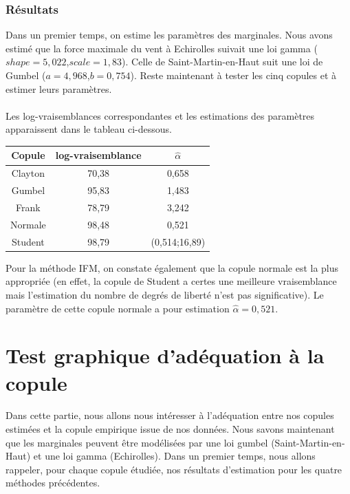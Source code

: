 \subsubsection{Résultats}

Dans un premier temps, on estime les paramètres des marginales. Nous avons estimé que la force maximale du vent à Echirolles suivait une loi gamma ($shape=5,022$,$scale=1,83$). Celle de Saint-Martin-en-Haut suit une loi de Gumbel ($a =4,968$,$b = 0,754$). Reste maintenant à tester les cinq copules et à estimer leurs paramètres.
\\ \\
 Les log-vraisemblances correspondantes et les estimations des paramètres apparaissent dans le tableau ci-dessous.

\begin{center}
\begin{tabular}{|c|c|c|}
\hline 
Copule & log-vraisemblance &  $\hat{\alpha}$ \\
\hline
Clayton & 70,38 & 0,658 \\
\hline
Gumbel & 95,83 & 1,483 \\
\hline
Frank & 78,79 & 3,242 \\
\hline
Normale &  98,48 & 0,521 \\
\hline
Student & 98,79 & (0,514;16,89)  \\
\hline
\end{tabular}
\end{center}

Pour la méthode IFM, on constate également que la copule normale est la plus appropriée (en effet, la copule de Student a certes une meilleure vraisemblance mais l'estimation du nombre de degrés de liberté n'est pas significative). Le paramètre de cette copule normale a pour estimation $\hat{\alpha}=0,521$.

\section{Test graphique d'adéquation à la copule}

Dans cette partie, nous allons nous intéresser à l'adéquation entre nos copules estimées et la copule empirique issue de nos données. Nous savons maintenant que les marginales peuvent être modélisées par une loi gumbel (Saint-Martin-en-Haut) et une loi gamma (Echirolles). Dans un premier temps, nous allons rappeler, pour chaque copule étudiée, nos résultats d'estimation pour les quatre méthodes précédentes. 

